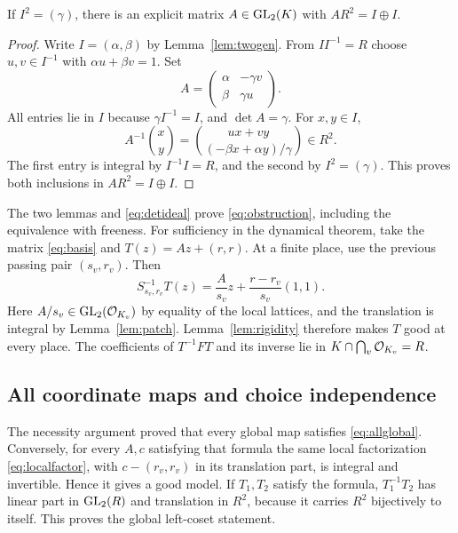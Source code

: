 \begin{lemma}\label{lem:basis}
If $I^2=(\gamma)$, there is an explicit matrix $A\in\operatorname{GL}_2(K)$
with $AR^2=I\oplus I$.
\end{lemma}
\begin{proof}
Write $I=(\alpha,\beta)$ by Lemma~\ref{lem:twogen}. From
$II^{-1}=R$ choose $u,v\in I^{-1}$ with $\alpha u+\beta v=1$.
Set
\begin{equation}\label{eq:basis}
 A=\begin{pmatrix}\alpha&-\gamma v\\
                    \beta&\gamma u\end{pmatrix}.
\end{equation}
All entries lie in $I$ because $\gamma I^{-1}=I$, and
$\det A=\gamma$. For $x,y\in I$,
\begin{equation}\label{eq:basisinverse}
 A^{-1}\binom xy
 =\binom{ux+vy}{(-\beta x+\alpha y)/\gamma}\in R^2.
\end{equation}
The first entry is integral by $I^{-1}I=R$, and the second by
$I^2=(\gamma)$. This proves both inclusions in $AR^2=I\oplus I$.
\end{proof}

The two lemmas and \eqref{eq:detideal} prove
\eqref{eq:obstruction}, including the equivalence with freeness.
For sufficiency in the dynamical theorem, take the matrix
\eqref{eq:basis} and $T(z)=Az+(r,r)$. At a finite place, use the
previous passing pair $(s_v,r_v)$. Then
\begin{equation}\label{eq:localfactor}
 S_{s_v,r_v}^{-1}T(z)
 =\frac{A}{s_v}z+\frac{r-r_v}{s_v}(1,1).
\end{equation}
Here $A/s_v\in\operatorname{GL}_2(\mathcal O_{K_v})$ by equality of the local lattices,
and the translation is integral by Lemma~\ref{lem:patch}.
Lemma~\ref{lem:rigidity} therefore makes $T$ good at every place.
The coefficients of $T^{-1}FT$ and its inverse lie in
$K\cap\bigcap_v\mathcal O_{K_v}=R$.

\subsection{All coordinate maps and choice independence}
The necessity argument proved that every global map satisfies
\eqref{eq:allglobal}. Conversely, for every $A,c$ satisfying that
formula the same local factorization \eqref{eq:localfactor}, with
$c-(r_v,r_v)$ in its translation part, is integral and invertible.
Hence it gives a good model. If $T_1,T_2$ satisfy the formula,
$T_1^{-1}T_2$ has linear part in $\operatorname{GL}_2(R)$ and translation in
$R^2$, because it carries $R^2$ bijectively to itself. This proves
the global left-coset statement.

